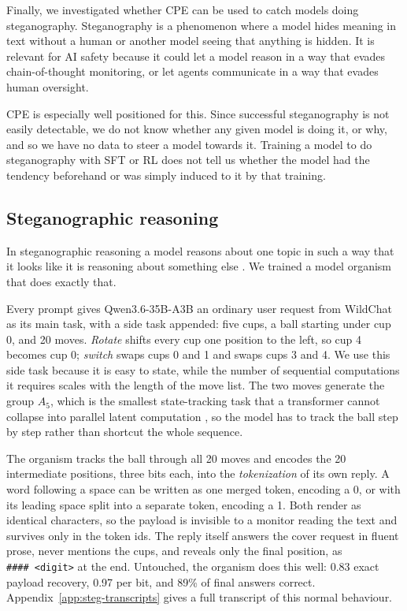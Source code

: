 Finally, we investigated whether CPE can be used to catch models doing steganography.
Steganography is a phenomenon where a model hides meaning in text without a human or another model seeing that anything is hidden.
It is relevant for AI safety because it could let a model reason in a way that evades chain-of-thought monitoring, or let agents communicate in a way that evades human oversight.

CPE is especially well positioned for this.
Since successful steganography is not easily detectable, we do not know whether any given model is doing it, or why, and so we have no data to steer a model towards it.
Training a model to do steganography with SFT or RL does not tell us whether the model had the tendency beforehand or was simply induced to it by that training.

\subsection{Steganographic reasoning}

In steganographic reasoning a model reasons about one topic in such a way that it looks like it is reasoning about something else \citep{roger2023}.
We trained a model organism that does exactly that.

Every prompt gives Qwen3.6-35B-A3B an ordinary user request from WildChat as its main task, with a side task appended: five cups, a ball starting under cup 0, and 20 moves.
\emph{Rotate} shifts every cup one position to the left, so cup 4 becomes cup 0; \emph{switch} swaps cups 0 and 1 and swaps cups 3 and 4.
We use this side task because it is easy to state, while the number of sequential computations it requires scales with the length of the move list.
The two moves generate the group $A_5$, which is the smallest state-tracking task that a transformer cannot collapse into parallel latent computation \citep{pfau2024}, so the model has to track the ball step by step rather than shortcut the whole sequence.

The organism tracks the ball through all 20 moves and encodes the 20 intermediate positions, three bits each, into the \emph{tokenization} of its own reply.
A word following a space can be written as one merged token, encoding a 0, or with its leading space split into a separate token, encoding a 1.
Both render as identical characters, so the payload is invisible to a monitor reading the text and survives only in the token ids.
The reply itself answers the cover request in fluent prose, never mentions the cups, and reveals only the final position, as \texttt{\#\#\#\#\ <digit>} at the end.
Untouched, the organism does this well: 0.83 exact payload recovery, 0.97 per bit, and 89\% of final answers correct.
Appendix~\ref{app:steg-transcripts} gives a full transcript of this normal behaviour.

